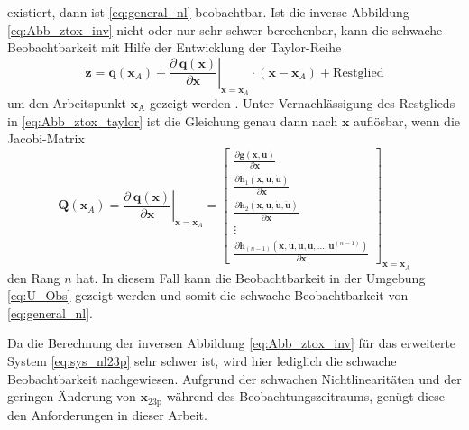 existiert, dann ist \eqref{eq:general_nl} beobachtbar. Ist die inverse Abbildung \eqref{eq:Abb_ztox_inv} nicht oder nur sehr schwer berechenbar, kann die schwache Beobachtbarkeit mit Hilfe der Entwicklung der Taylor-Reihe
\begin{equation}\label{eq:Abb_ztox_taylor}
\pmb{z} = \pmb{q}(\pmb{x}_A) + \left.\frac{\partial\ \pmb{q}(\pmb{x})}{\partial \pmb{x}}\right|_{\pmb{x}=\pmb{x}_A}\cdot (\pmb{x}-\pmb{x}_A)+\mathrm{Restglied}
\end{equation}
 um den Arbeitspunkt $\pmb{x}_\mathrm{A}$ gezeigt werden \cite{Adamy.2018}. Unter Vernachlässigung des Restglieds in \eqref{eq:Abb_ztox_taylor} ist die Gleichung genau dann nach $\pmb{x}$ auflösbar, wenn die Jacobi-Matrix
\begin{equation}\label{eq:dq_dx}
\pmb{Q}(\pmb{x}_A) = \left.\frac{\partial\ \pmb{q}(\pmb{x})}{\partial \pmb{x}}\right|_{\pmb{x}=\pmb{x}_A} = \begin{bmatrix}\frac{\partial \pmb{g}(\pmb{x},\pmb{u})}{\partial \pmb{x}} \\ \frac{\partial \pmb{h}_1(\pmb{x},\pmb{u},\pmb{\dot{u}})}{\partial \pmb{x}} \\ \frac{\partial \pmb{h}_2(\pmb{x},\pmb{u},\pmb{\dot{u}},\pmb{\ddot{u}})}{\partial \pmb{x}}\\ \vdots \\ \frac{\partial \pmb{h}_{(n-1)}(\pmb{x},\pmb{u},\pmb{\dot{u}},\pmb{\ddot{u}},\dots,\pmb{u}^{(n-1)})}{\partial \pmb{x}} \end{bmatrix}_{\pmb{x}=\pmb{x}_A}
\end{equation}
den Rang $n$ hat. In diesem Fall kann die Beobachtbarkeit in der Umgebung \eqref{eq:U_Obs} gezeigt werden und somit die schwache Beobachtbarkeit von \eqref{eq:general_nl}.

Da die Berechnung der inversen Abbildung \eqref{eq:Abb_ztox_inv} für das erweiterte System \eqref{eq:sys_nl23p} sehr schwer ist, wird hier lediglich die schwache Beobachtbarkeit nachgewiesen. Aufgrund der schwachen Nichtlinearitäten und der geringen Änderung von $\pmb{x}_\mathrm{23p}$ während des Beobachtungszeitraums, genügt diese den Anforderungen in dieser Arbeit.

